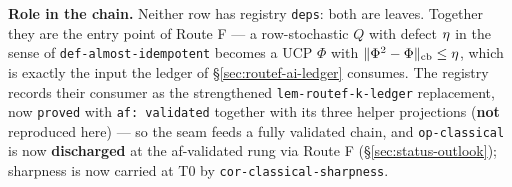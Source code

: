 \noindent\textbf{Role in the chain.} Neither row has registry \texttt{deps}: both are
leaves. Together they are the entry point of Route F --- a row-stochastic $Q$ with defect
$\eta$ in the sense of \texttt{def-almost-idempotent} becomes a UCP $\Phi$ with
$\lVert \Phi^{2}-\Phi\rVert_{\mathrm{cb}}\le\eta$, which is exactly the input the ledger of
\S\ref{sec:routef-ai-ledger} consumes. The registry records their consumer as the
strengthened \texttt{lem-routef-k-ledger} replacement, now \texttt{proved} with
\texttt{af: validated} together with its three helper projections (\textbf{not}
reproduced here) --- so the seam feeds a fully validated chain, and
\texttt{op-classical} is now \textbf{discharged} at the af-validated rung via Route F
(\S\ref{sec:status-outlook}); sharpness is now carried at T0 by \texttt{cor-classical-sharpness}.
